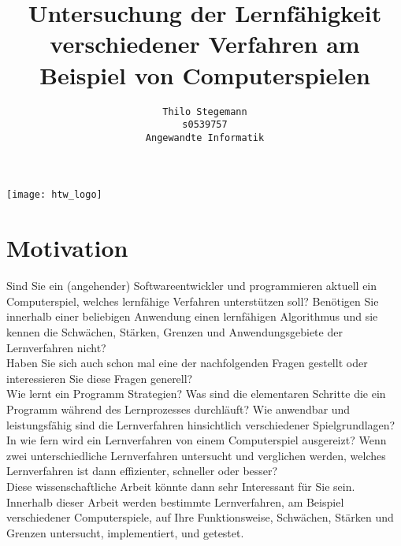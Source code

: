 \documentclass[12pt,a4paper]{scrartcl}
\begin{document}
\subject{Exposé Bachelorarbeit}
\author{
	\texttt{Thilo Stegemann}\\
	\texttt{s0539757}\\
	\texttt{Angewandte Informatik}}
\title{Untersuchung der Lernfähigkeit verschiedener Verfahren am Beispiel von Computerspielen}

\maketitle
\centerline{\texttt{[image: htw\_logo]}}

\section*{Motivation}
Sind Sie ein (angehender) Softwareentwickler und programmieren aktuell ein Computerspiel, welches lernfähige Verfahren unterstützen soll? Benötigen Sie innerhalb einer beliebigen Anwendung einen lernfähigen Algorithmus und sie kennen die Schwächen, Stärken, Grenzen und Anwendungsgebiete der Lernverfahren nicht?\\

Haben Sie sich auch schon mal eine der nachfolgenden Fragen gestellt oder interessieren Sie diese Fragen generell?\\

Wie lernt ein Programm Strategien? Was sind die elementaren Schritte die ein Programm  während des Lernprozesses durchläuft? Wie anwendbar und leistungsfähig sind die Lernverfahren hinsichtlich verschiedener Spielgrundlagen? In wie fern wird ein Lernverfahren von einem Computerspiel ausgereizt? Wenn zwei unterschiedliche Lernverfahren untersucht und verglichen werden, welches Lernverfahren ist dann effizienter, schneller oder besser?\\

Diese wissenschaftliche Arbeit könnte dann sehr Interessant für Sie sein. Innerhalb dieser Arbeit werden bestimmte Lernverfahren, am Beispiel verschiedener Computerspiele, auf Ihre Funktionsweise, Schwächen, Stärken und Grenzen untersucht, implementiert, und getestet. 
\end{document}
